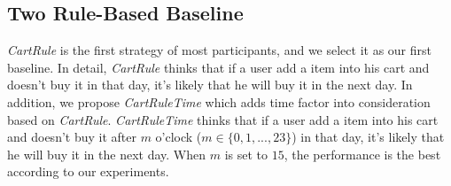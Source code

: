 \documentclass{llncs}
\begin{document}

\subsection{Two Rule-Based Baseline}
\emph{CartRule} is the first strategy of most participants, and we select it as our first baseline.
In detail, \emph{CartRule} thinks that if a user add a item into his cart and doesn't buy it in that day,
it's likely that he will buy it in the next day.
In addition, we propose \emph{CartRuleTime} which adds time factor into consideration based on \emph{CartRule}.
\emph{CartRuleTime} thinks that if a user add a item into his cart and doesn't buy it
after $m$ o'clock ($ m \in \{ 0, 1, ..., 23 \} $) in that day,
it's likely that he will buy it in the next day.
When $m$ is set to $15$, the performance is the best according to our experiments.


\end{document}

